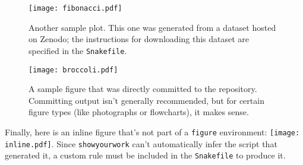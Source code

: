 \documentclass[twocolumn]{aastex631}
\begin{document}
\begin{figure}[ht!]
    \begin{centering}
        \texttt{[image: fibonacci.pdf]}
        \caption{
            Another sample plot.
            This one was generated from a dataset hosted on Zenodo; the instructions for downloading this dataset are specified in the \texttt{Snakefile}.
        }
        \label{fig:fibonacci}
    \end{centering}
\end{figure}

\begin{figure}[ht!]
    \begin{centering}
        \texttt{[image: broccoli.pdf]}
        \caption{
            A sample figure that was directly committed to the repository.
            Committing output isn't generally recommended, but for certain figure types (like photographs or flowcharts), it makes sense.
        }
        \label{fig*:broccoli}
    \end{centering}
\end{figure}

Finally, here is an inline figure that's not part of a \verb+figure+ environment: \texttt{[image: inline.pdf]}. Since \texttt{showyourwork} can't automatically infer the script that generated it, a custom rule must be included in the \texttt{Snakefile} to produce it.
\end{document}

